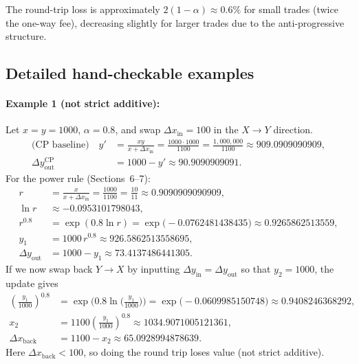 \documentclass[11pt]{article}
\theoremstyle{definition}
\theoremstyle{remark}
\newcommand{\dx}{\Delta x}
\newcommand{\dy}{\Delta y}
\begin{document}
The round-trip loss is approximately $2(1-\alpha)\approx 0.6\%$ for small trades (twice the one-way fee), decreasing slightly for larger trades due to the anti-progressive structure.

\subsection{Detailed hand-checkable examples}

\paragraph{Example 1 (not strict additive):} Let \(x=y=1000\), \(\alpha=0.8\), and swap \(\dx_{\mathrm{in}}=100\) in the \(X\to Y\) direction.
\begin{align*}
\text{(CP baseline)}\quad
y' &= \frac{xy}{x+\dx_{\mathrm{in}}} = \frac{1000\cdot 1000}{1100} = \frac{1{,}000{,}000}{1100} \approx 909.0909090909,\\
\dy_{\mathrm{out}}^{\mathrm{CP}} &= 1000 - y' \approx 90.9090909091.
\end{align*}
For the power rule (Sections~6--7):
\begin{align*}
r &= \frac{x}{x+\dx_{\mathrm{in}}} = \frac{1000}{1100}=\frac{10}{11}\approx 0.9090909090909,\\
\ln r &\approx -0.0953101798043,\\
r^{0.8} &= \exp(0.8\ln r)=\exp\!\big(-0.0762481438435\big)\approx 0.9265862513559,\\
y_1 &= 1000\,r^{0.8} \approx 926.5862513558695,\\
\dy_{\mathrm{out}} &= 1000 - y_1 \approx 73.4137486441305.
\end{align*}
If we now swap back \(Y\to X\) by inputting \(\dy_{\mathrm{in}}=\dy_{\mathrm{out}}\) so that \(y_2=1000\), the update gives
\begin{align*}
\left(\frac{y_1}{1000}\right)^{0.8}
&= \exp\!\Big(0.8\ln\!\big(\tfrac{y_1}{1000}\big)\Big)
= \exp\!\big(-0.0609985150748\big)\approx 0.9408246368292,\\
x_2 &= 1100\left(\frac{y_1}{1000}\right)^{0.8} \approx 1034.9071005121361,\\
\dx_{\mathrm{back}} &= 1100-x_2 \approx 65.0928994878639.
\end{align*}
Here \(\dx_{\mathrm{back}}<100\), so doing the round trip loses value (not strict additive).
\end{document}

